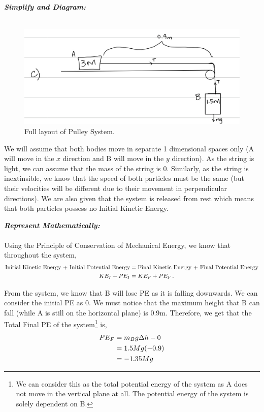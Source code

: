 \begin{subquestions}
\textbf{\textit{Simplify and Diagram:}} \\ \\
\begin{figure}[H]
	\begin{center}
		\includegraphics[scale=0.25]{../2015/figures/2015q6-3}
		\caption{\label{2015:q6:fig:Diagram3} Full layout of Pulley System.}
	\end{center}
\end{figure}
We will assume that both bodies move in separate 1 dimensional spaces only (A will move in the $x$ direction and B will move in the $y$ direction). As the string is light, we can assume that the mass of the string is 0. Similarly, as the string is inextinsible, we know that the speed of both particles must be the same (but their velocities will be different due to their movement in perpendicular directions). We are also given that the system is released from rest which means that both particles possess no Initial Kinetic Energy.
	
	
	
	
\textbf{\textit{Represent Mathematically:}} \\ \\
Using the Principle of Conservation of Mechanical Energy, we know that throughout the system,
\begin{align}
	\text{Initial Kinetic Energy + Initial Potential Energy} & = \text{Final Kinetic Energy + Final Potential Energy} \nonumber \\
	KE_I + PE_I & = KE_F + PE_F \,. \label{2015:q6:energy1}
\end{align}

From the system, we know that B will lose PE as it is falling downwards. We can consider the initial PE as 0. We must notice that the maximum height that B can fall (while A is still on the horizontal plane) is 0.9m. Therefore, we get that the Total Final PE of the system\footnote{We can consider this as the total potential energy of the system as A does not move in the vertical plane at all. The potential energy of the system is solely dependent on B.} is,
\begin{align}
	PE_F &  = m_Bg\Delta h - 0 \nonumber \\
	          & = 1.5Mg(-0.9) \nonumber \\
	          & = -1.35Mg
\end{align}


\end{subquestions}
